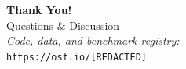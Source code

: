 \documentclass[11pt,aspectratio=169]{beamer}
\begin{document}
\begin{frame}
    \begin{center}
        \Huge \textbf{Thank You!} \\
        \vspace{0.5cm}
        \large Questions \& Discussion \\
        \vspace{0.5cm}
        \normalsize
        \textit{Code, data, and benchmark registry:}\\
        \texttt{https://osf.io/[REDACTED]}
    \end{center}
\end{frame}
\end{document}
